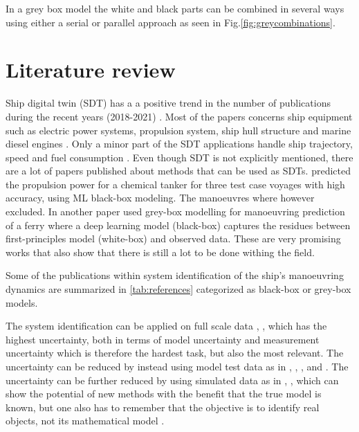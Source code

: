 \noindent In a grey box model the white and black parts can be combined in several ways using either a serial or parallel approach \cite{leifsson_grey-box_2008} as seen in Fig.\ref{fig:greycombinations}. 



\section{Literature review}
Ship digital twin (SDT) has a a positive trend in the number of publications during the recent years (2018-2021)  \cite{assani_ships_2022}. Most of the papers concerns ship equipment such as electric power systems, propulsion system, ship hull structure and marine diesel engines \cite{assani_ships_2022}. Only a minor part of the SDT applications handle ship trajectory, speed and fuel consumption \cite{assani_ships_2022}.   
Even though SDT is not explicitly mentioned, there are a lot of papers published about methods that can be used as SDTs. \cite{lang_comparison_2022} predicted the propulsion power for a chemical tanker for three test case voyages with high accuracy, using ML black-box modeling. The manoeuvres where however excluded. In another paper \cite{nielsen_machine_2022} used grey-box modelling for manoeuvring prediction of a ferry where a deep learning model (black-box) captures the residues between first-principles model (white-box) and observed data. These are very promising works that also show that there is still a lot to be done withing the field. 

Some of the publications within system identification of the ship's manoeuvring dynamics are summarized in \autoref{tab:references} categorized as black-box or grey-box models.
 
\noindent The system identification can be applied on full scale data \cite{astrom_identification_1976}, \cite{perera_system_2015}, \cite{revestido_herrero_two-step_2012} which has the highest uncertainty, both in terms of model uncertainty and measurement uncertainty which is therefore the hardest task, but also the most relevant. The uncertainty can be reduced by instead using model test data as in \cite{araki_estimating_2012}, \cite{he_nonparametric_2022}, \cite{xue_identification_2021}, \cite{miller_ship_2021} and \cite{luo_parameter_2016} . The uncertainty can be further reduced by using simulated data as in \cite{shi_identification_2009}, \cite{zhu_parameter_2017}, \cite{wang_parameter_2021} which can show the potential of new methods with the benefit that the true model is known, but one also has to remember that the objective is to identify real objects, not its mathematical model \cite{miller_ship_2021}.

